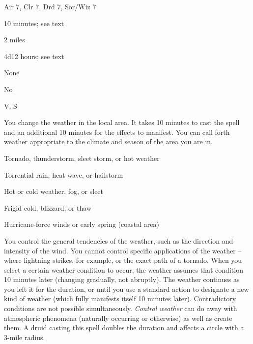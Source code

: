 
\begin{description*}
\item[Level:] Air 7, Clr 7, Drd 7, Sor/Wiz 7
\item[Casting Time:] 10 minutes; see text
\item[Range:] 2 miles
\item[Duration:] 4d12 hours; see text
\item[Saving Throw:] None
\item[Spell Resistance:] No
\item[Components:] V, S
\end{description*}

You change the weather in the local area. It takes 10 minutes to cast the spell
and an additional 10 minutes for the effects to manifest. You can call
forth weather appropriate to the climate and season of the area you are in.
\begin{description*}
\item[Spring] Tornado, thunderstorm, sleet storm, or hot weather
\item[Summer] Torrential rain, heat wave, or hailstorm
\item[Fall] Hot or cold weather, fog, or sleet
\item[Winter] Frigid cold, blizzard, or thaw
\item[Late Winter] Hurricane-force winds or early spring (coastal area)
\end{description*}
You control the general tendencies of the weather, such as the direction and intensity
of the wind. You cannot control specific applications of the weather -- where lightning
strikes, for example, or the exact path of a tornado. When you select a certain
weather condition to occur, the weather assumes that condition 10 minutes later
(changing gradually, not abruptly). The weather continues as you left it for the
duration, or until you use a standard action to designate a new kind of weather
(which fully manifests itself 10 minutes later). Contradictory conditions are not
possible simultaneously.
\textit{Control weather} can do away with atmospheric phenomena (naturally occurring
or otherwise) as well as create them.
A druid casting this spell doubles the duration and affects a circle with a 3-mile
radius.